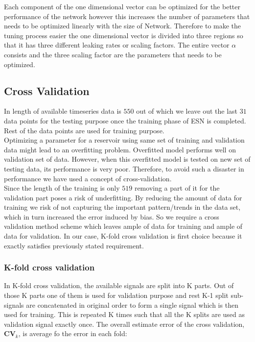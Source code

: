 Each component of the one dimensional vector can be optimized for the better performance of the network however this increases the number of parameters that needs to be optimized linearly with the size of Network. Therefore to make the tuning process easier the one dimensional vector is divided into three regions so that it has three different leaking rates or scaling factors. The entire vector $\alpha$ consists and the three scaling factor are the parameters that needs to be optimized.

\subsection{Cross Validation}
\indent \indent
	In length of available timeseries data is $550$ out of which we leave out the last $31$ data points for the testing purpose once the training phase of ESN is completed. Rest of the data points are used for training purpose.\\
	Optimizing a parameter for a reservoir using same set of training and validation data might lead to an overfitting problem. 
	    Overfitted model performs well on validation set of data. However, when this overfitted model is tested on new set of testing data, its performance is very poor. Therefore, to avoid such a disaster in performance we have used a concept of cross-validation.
	\\
Since the length of the training is only $519$ removing a part of it for the validation part poses a risk of underfitting.  By reducing the amount of data for training we risk of not capturing the important pattern/trends in the data set, which in turn increased the error induced by bias. So we require a cross validation method scheme which leaves ample of data for training and ample of data for validation. In our case, K-fold cross validation is first choice because it exactly satisfies previously stated requirement.


\subsubsection{K-fold cross validation}
\label{kfold}
    
In K-fold cross validation, the available signals are split into K parts. Out of those K parts one of them is used for validation purpose and rest K-1 split sub-signals are concatenated in original order to form a single signal which is then used for training. This is repeated K times such that all the K splits are used as validation signal exactly once. The overall estimate  error of the cross validation, $\textbf{CV}_k$, is average fo the error in each fold:
 

